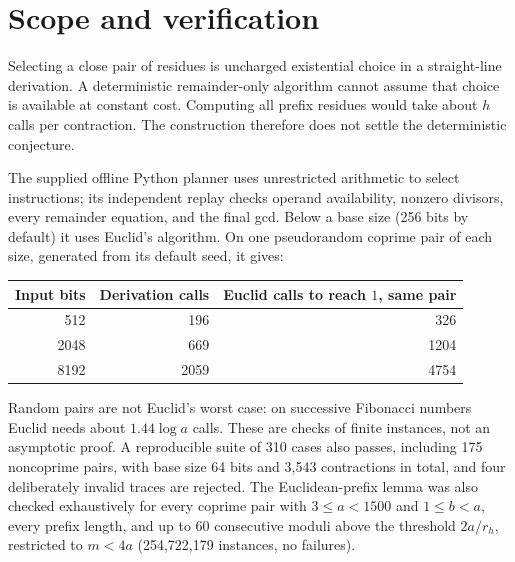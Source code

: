 \documentclass[11pt]{article}
\begin{document}
\section{Scope and verification}\label{sec:scope}
Selecting a close pair of residues is uncharged existential choice in a
straight-line derivation. A deterministic remainder-only algorithm cannot
assume that choice is available at constant cost. Computing all prefix
residues would take about $h$ calls per contraction. The construction therefore
does not settle the deterministic conjecture.

The supplied offline Python planner uses unrestricted arithmetic to select
instructions; its independent replay checks operand availability, nonzero
divisors, every remainder equation, and the final gcd. Below a base size
(256 bits by default) it uses Euclid's algorithm. On one pseudorandom coprime
pair of each size, generated from its default seed, it gives:
\begin{center}
\begin{tabular}{rrr}\toprule
Input bits & Derivation calls & Euclid calls to reach $1$, same pair\\\midrule
512 & 196 & 326\\
2048 & 669 & 1204\\
8192 & 2059 & 4754\\\bottomrule
\end{tabular}
\end{center}
Random pairs are not Euclid's worst case: on successive Fibonacci numbers
Euclid needs about $1.44\log a$ calls. These are checks of finite instances,
not an asymptotic proof. A reproducible suite of 310 cases also passes,
including 175 noncoprime pairs, with base size 64 bits and 3,543
contractions in total, and four deliberately invalid traces are rejected. The
Euclidean-prefix lemma was also checked exhaustively for every coprime pair
with $3\leq a<1500$ and $1\leq b<a$, every prefix length, and up to 60
consecutive moduli above the threshold $2a/r_h$, restricted to $m<4a$
(254,722,179 instances, no failures).
\end{document}
